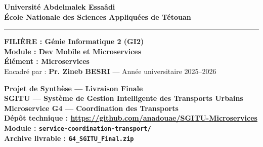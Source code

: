 \documentclass[12pt,a4paper]{report}
\begin{document}
\begin{titlepage}
    \begin{center}
        \vspace*{0.3cm}

        \vspace{0.8cm}
        {\large \textbf{Université Abdelmalek Essaâdi}}\\
        {\large \textbf{École Nationale des Sciences Appliquées de Tétouan}}\\

        \vspace{0.5cm}
        \rule{\textwidth}{1pt}
        \vspace{0.5cm}

        {\color{ensablue}\textbf{FILIÈRE : Génie Informatique 2 (GI2)}}\\[0.15cm]
        {\large \textbf{Module : Dev Mobile et Microservices}}\\[0.15cm]
        {\large \textbf{Élément : Microservices}}\\[0.15cm]
        {\normalsize Encadré par : \textbf{Pr. Zineb BESRI} — Année universitaire 2025--2026}

        \vspace{0.9cm}
        \begin{tcolorbox}[colback=gray!8, colframe=ensablue, width=0.94\textwidth, arc=6mm, boxrule=0.8pt]
        \centering
        \Large\bfseries Projet de Synthèse — Livraison Finale\\[0.35cm]
        \normalsize
        \textbf{SGITU} — Système de Gestion Intelligente des Transports Urbains\\[0.25cm]
        Microservice \textbf{G4 — Coordination des Transports}\\[0.35cm]
        \small
        Dépôt technique : \url{https://github.com/anadouae/SGITU-Microservices}\\
        Module : \texttt{service-coordination-transport/}\\
        Archive livrable : \texttt{G4\_SGITU\_Final.zip}
        \end{tcolorbox}


\end{center}
\end{titlepage}
\end{document}
